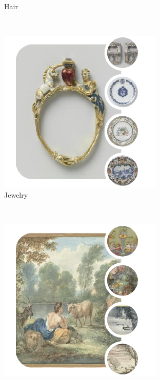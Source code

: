 \documentclass[runningheads]{llncs}
\begin{document}
\begin{figure}
\begin{subfigure}[b]{0.3\textwidth}
		\caption{Hair}
		\label{fig:hair}
	\end{subfigure}
	~ %
	\begin{subfigure}[b]{0.3\textwidth}
		\includegraphics[width=\textwidth]{figures/data_supervisor/jewelry}
		\caption{Jewelry}
		\label{fig:jewelry}
	\end{subfigure}
	~ %
	\begin{subfigure}[b]{0.3\textwidth}
		\includegraphics[width=\textwidth]{figures/data_supervisor/painting}

\end{subfigure}
\end{figure}
\end{document}
